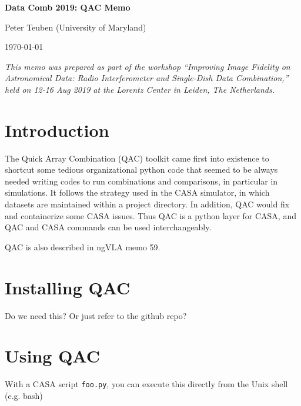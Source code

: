 \documentclass[12pt,a4paper]{article}
\begin{document}
\pagestyle{plain}
 

\begin{center}
{\Large{\bf{  Data Comb 2019: QAC Memo \\  }}} 

\end{center}
\bigskip

\centerline{Peter Teuben (University of Maryland)}

\centerline{\today}
\bigskip

\noindent \textit{This memo was prepared as part of the workshop ``Improving Image Fidelity on Astronomical Data: Radio Interferometer and Single-Dish Data Combination,'' held on 12-16 Aug 2019 at the Lorentz Center in Leiden, The Netherlands.}

\section{Introduction}

The Quick Array Combination (QAC) toolkit came first into existence to shortcut some tedious organizational python code that seemed to be always needed
writing codes to run combinations and comparisons, in particular in simulations. It follows the strategy used in the CASA simulator, in which
datasets are maintained within a project directory. In addition, QAC would fix and containerize some CASA issues. Thus QAC is a python layer for CASA,
and QAC and CASA commands can be used interchangeably.

QAC is also described in ngVLA memo 59.

\section{Installing QAC}

Do we need this?  Or just refer to the github repo?

\section{Using QAC}

With a CASA script \verb+foo.py+, you can execute this directly from the Unix shell (e.g. bash) 

\begin{lstlisting}[language=bash]
    % casa --nogui -c foo.py pixel=0.1 > test1.log 2>&1
\end{lstlisting}
\end{document}

